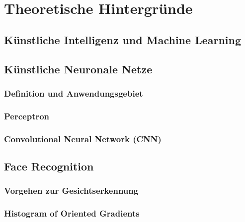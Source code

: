 \documentclass[12pt,ngerman,a4paper,oneside,,tablecaptionabove]{scrbook}
\begin{document}
\hypertarget{sec:Theorie}{%
\chapter{Theoretische Hintergründe}\label{sec:Theorie}}

\hypertarget{sec:KIuML}{%
\section{Künstliche Intelligenz und Machine Learning}\label{sec:KIuML}}

\hypertarget{sec:NN}{%
\section{Künstliche Neuronale Netze}\label{sec:NN}}

\hypertarget{definition-und-anwendungsgebiet}{%
\subsection{Definition und
Anwendungsgebiet}\label{definition-und-anwendungsgebiet}}

\hypertarget{perceptron}{%
\subsection{Perceptron}\label{perceptron}}

\hypertarget{convolutional-neural-network-cnn}{%
\subsection{Convolutional Neural Network
(CNN)}\label{convolutional-neural-network-cnn}}

\hypertarget{sec:FaceRecognition}{%
\section{Face Recognition}\label{sec:FaceRecognition}}

\hypertarget{vorgehen-zur-gesichtserkennung}{%
\subsection{Vorgehen zur
Gesichtserkennung}\label{vorgehen-zur-gesichtserkennung}}

\hypertarget{histogram-of-oriented-gradients}{%
\subsection{Histogram of Oriented
Gradients}\label{histogram-of-oriented-gradients}}
\end{document}
